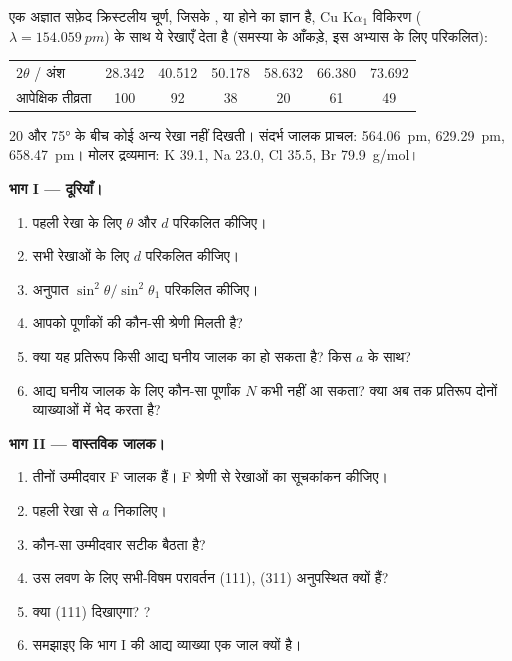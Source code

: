 \begin{problem}
\label{pb:b3:x-ray-diffraction:1}
एक अज्ञात सफ़ेद क्रिस्टलीय चूर्ण, जिसके ,  या  होने का ज्ञान है,
Cu K$\alpha_1$ विकिरण ($\lambda = \qty{154.059}{pm}$) के साथ ये रेखाएँ देता है (समस्या के
आँकड़े, इस अभ्यास के लिए परिकलित):
\begin{center}\small
\begin{tabular}{lcccccc}
\hline
$2\theta$ / अंश & 28.342 & 40.512 & 50.178 & 58.632 & 66.380 & 73.692 \\
आपेक्षिक तीव्रता & 100 & 92 & 38 & 20 & 61 & 49 \\ \hline
\end{tabular}
\end{center}
20 और \ang{75} के बीच कोई अन्य रेखा नहीं दिखती। संदर्भ जालक प्राचल:
 \qty{564.06}{pm},  \qty{629.29}{pm},  \qty{658.47}{pm}। मोलर द्रव्यमान:
K 39.1, Na 23.0, Cl 35.5, Br \qty{79.9}{g/mol}।

\medskip\noindent\textbf{भाग I --- दूरियाँ।}
\begin{enumerate}
  \item पहली रेखा के लिए $\theta$ और $d$ परिकलित कीजिए।
  \item सभी रेखाओं के लिए $d$ परिकलित कीजिए।
  \item अनुपात $\sin^2\theta/\sin^2\theta_1$ परिकलित कीजिए।
  \item आपको पूर्णांकों की कौन-सी श्रेणी मिलती है?
  \item क्या यह प्रतिरूप किसी आद्य घनीय जालक का हो सकता है? किस $a$ के साथ?
  \item आद्य घनीय जालक के लिए कौन-सा पूर्णांक $N$ कभी नहीं आ सकता? क्या
        अब तक प्रतिरूप दोनों व्याख्याओं में भेद करता है?
\end{enumerate}

\medskip\noindent\textbf{भाग II --- वास्तविक जालक।}
\begin{enumerate}[resume]
  \item तीनों उम्मीदवार F जालक हैं। F श्रेणी से रेखाओं का सूचकांकन कीजिए।
  \item पहली रेखा से $a$ निकालिए।
  \item कौन-सा उम्मीदवार सटीक बैठता है?
  \item उस लवण के लिए सभी-विषम परावर्तन (111), (311) अनुपस्थित क्यों हैं?
  \item क्या  (111) दिखाएगा? ?
  \item समझाइए कि भाग I की आद्य व्याख्या एक जाल क्यों है।
\end{enumerate}


\end{problem}
